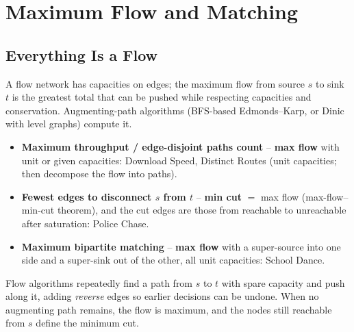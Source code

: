 \chapter{Maximum Flow and Matching}

\section{Everything Is a Flow}
\label{sec:cses-graph-flows-intro}

A flow network has capacities on edges; the maximum flow from source $s$
to sink $t$ is the greatest total that can be pushed while respecting
capacities and conservation. Augmenting-path algorithms (BFS-based
Edmonds--Karp, or Dinic with level graphs) compute it.

\begin{patternbox}
\begin{itemize}
  \item \textbf{Maximum throughput / edge-disjoint paths count} --
        \textbf{max flow} with unit or given capacities: Download Speed,
        Distinct Routes (unit capacities; then decompose the flow into
        paths).
  \item \textbf{Fewest edges to disconnect $s$ from $t$} -- \textbf{min
        cut} $=$ max flow (max-flow--min-cut theorem), and the cut edges
        are those from reachable to unreachable after saturation: Police
        Chase.
  \item \textbf{Maximum bipartite matching} -- \textbf{max flow} with a
        super-source into one side and a super-sink out of the other, all
        unit capacities: School Dance.
  \end{itemize}
\end{patternbox}

\begin{ideabox}
Flow algorithms repeatedly find a path from $s$ to $t$ with spare capacity
and push along it, adding \emph{reverse} edges so earlier decisions can be
undone. When no augmenting path remains, the flow is maximum, and the
nodes still reachable from $s$ define the minimum cut.
\end{ideabox}

\newpage





